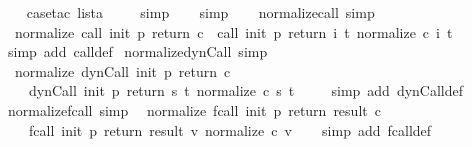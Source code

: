 \begin{isabellebody}
\ \ \isamarkupfalse%
\ {\isacharparenleft}case{\isacharunderscore}tac\ lista{\isacharparenright}\isanewline
\ \ \isamarkupfalse%
\ \ simp\isanewline
\ \ \isamarkupfalse%
\ simp\isanewline
\ \ \isamarkupfalse%
%
\endisatagproof
{\isafoldproof}%
%
\isadelimproof
\isanewline
%
\endisadelimproof
\isanewline
{}\isamarkupfalse%
\ normalize{\isacharunderscore}call\ {\isacharbrackleft}simp{\isacharbrackright}{\isacharcolon}\ \isanewline
\ \ {\isachardoublequoteopen}normalize\ {\isacharparenleft}call\ init\ p\ return\ c{\isacharparenright}\ {\isacharequal}\ call\ init\ p\ return\ {\isacharparenleft}{\isasymlambda}i\ t{\isachardot}\ normalize\ {\isacharparenleft}c\ i\ t{\isacharparenright}{\isacharparenright}{\isachardoublequoteclose}\isanewline
%
\isadelimproof
\ \ %
\endisadelimproof
%
\isatagproof
{}\isamarkupfalse%
\ {\isacharparenleft}simp\ add{\isacharcolon}\ call{\isacharunderscore}def{\isacharparenright}%
\endisatagproof
{\isafoldproof}%
%
\isadelimproof
\isanewline
%
\endisadelimproof
\isanewline
{}\isamarkupfalse%
\ normalize{\isacharunderscore}dynCall\ {\isacharbrackleft}simp{\isacharbrackright}{\isacharcolon}\isanewline
\ \ {\isachardoublequoteopen}normalize\ {\isacharparenleft}dynCall\ init\ p\ return\ c{\isacharparenright}\ {\isacharequal}\ \isanewline
\ \ \ \ dynCall\ init\ p\ return\ {\isacharparenleft}{\isasymlambda}s\ t{\isachardot}\ normalize\ {\isacharparenleft}c\ s\ t{\isacharparenright}{\isacharparenright}{\isachardoublequoteclose}\ \isanewline
%
\isadelimproof
\ \ %
\endisadelimproof
%
\isatagproof
{}\isamarkupfalse%
\ {\isacharparenleft}simp\ add{\isacharcolon}\ dynCall{\isacharunderscore}def{\isacharparenright}%
\endisatagproof
{\isafoldproof}%
%
\isadelimproof
\isanewline
%
\endisadelimproof
\isanewline
{}\isamarkupfalse%
\ normalize{\isacharunderscore}fcall\ {\isacharbrackleft}simp{\isacharbrackright}{\isacharcolon}\isanewline
\ \ {\isachardoublequoteopen}normalize\ {\isacharparenleft}fcall\ init\ p\ return\ result\ c{\isacharparenright}\ {\isacharequal}\ \isanewline
\ \ \ \ fcall\ init\ p\ return\ result\ {\isacharparenleft}{\isasymlambda}v{\isachardot}\ normalize\ {\isacharparenleft}c\ v{\isacharparenright}{\isacharparenright}{\isachardoublequoteclose}\isanewline
%
\isadelimproof
\ \ %
\endisadelimproof
%
\isatagproof
{}\isamarkupfalse%
\ {\isacharparenleft}simp\ add{\isacharcolon}\ fcall{\isacharunderscore}def{\isacharparenright}%
\endisatagproof
{\isafoldproof}%
%
\isadelimproof

\end{isabellebody}
